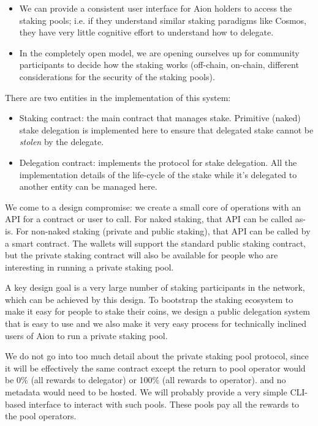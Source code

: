 \begin{itemize}
  \item We can provide a consistent user interface for Aion holders to access the staking pools; i.e. if they understand similar staking paradigms like Cosmos, they have very little cognitive effort to understand how to delegate.  
  \item In the completely open model, we are opening ourselves up for community participants to decide how the staking works (off-chain, on-chain, different considerations for the security of the staking pools). 
\end{itemize}

There are two entities in the implementation of this system: 
\begin{itemize}
    \item Staking contract: the main contract that manages stake. Primitive (naked) stake delegation is implemented here to ensure that delegated stake cannot be \textit{stolen} by the delegate.
    \item Delegation contract: implements the protocol for stake delegation. All the implementation details of the life-cycle of the stake while it's delegated to another entity can be managed here.  
\end{itemize}

We come to a design compromise: we create a small core of operations with an API for a contract or user to call. For naked staking, that API can be called as-is. For non-naked staking (private and public staking), that API can be called by a smart contract. The wallets will support the standard public staking contract, but the private staking contract will also be available for people who are interesting in running a private staking pool. 

A key design goal is a very large number of staking participants in the network, which can be achieved by this design. To bootstrap the staking ecosystem to make it easy for people to stake their coins, we design a public delegation system that is easy to use and we also make it very easy process for technically inclined users of Aion to run a private staking pool. 

We do not go into too much detail about the private staking pool protocol, since it will be effectively the same contract except the return to pool operator would be 0\% (all rewards to delegator) or 100\% (all rewards to operator). and no metadata would need to be hosted. We will probably provide a very simple CLI-based interface to interact with such pools. These pools pay all the rewards to the pool operators.


